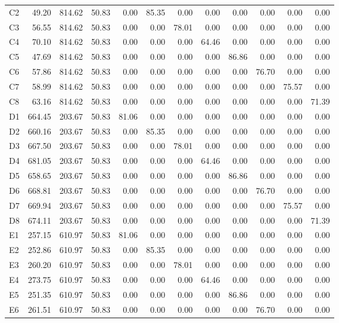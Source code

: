 \documentclass[sn-nature, twocolumn]{sn-jnl}%
\theoremstyle{thmstyleone}%
\theoremstyle{thmstyletwo}%
\theoremstyle{thmstylethree}%
\begin{document}
\begin{table}[!htb]
\begin{tabular}{lrrrrrrrrrrr}
C2 & 49.20 & 814.62 & 50.83 & 0.00 & 85.35 & 0.00 & 0.00 & 0.00 & 0.00 & 0.00 & 0.00 \\
C3 & 56.55 & 814.62 & 50.83 & 0.00 & 0.00 & 78.01 & 0.00 & 0.00 & 0.00 & 0.00 & 0.00 \\
C4 & 70.10 & 814.62 & 50.83 & 0.00 & 0.00 & 0.00 & 64.46 & 0.00 & 0.00 & 0.00 & 0.00 \\
C5 & 47.69 & 814.62 & 50.83 & 0.00 & 0.00 & 0.00 & 0.00 & 86.86 & 0.00 & 0.00 & 0.00 \\
C6 & 57.86 & 814.62 & 50.83 & 0.00 & 0.00 & 0.00 & 0.00 & 0.00 & 76.70 & 0.00 & 0.00 \\
C7 & 58.99 & 814.62 & 50.83 & 0.00 & 0.00 & 0.00 & 0.00 & 0.00 & 0.00 & 75.57 & 0.00 \\
C8 & 63.16 & 814.62 & 50.83 & 0.00 & 0.00 & 0.00 & 0.00 & 0.00 & 0.00 & 0.00 & 71.39 \\
D1 & 664.45 & 203.67 & 50.83 & 81.06 & 0.00 & 0.00 & 0.00 & 0.00 & 0.00 & 0.00 & 0.00 \\
D2 & 660.16 & 203.67 & 50.83 & 0.00 & 85.35 & 0.00 & 0.00 & 0.00 & 0.00 & 0.00 & 0.00 \\
D3 & 667.50 & 203.67 & 50.83 & 0.00 & 0.00 & 78.01 & 0.00 & 0.00 & 0.00 & 0.00 & 0.00 \\
D4 & 681.05 & 203.67 & 50.83 & 0.00 & 0.00 & 0.00 & 64.46 & 0.00 & 0.00 & 0.00 & 0.00 \\
D5 & 658.65 & 203.67 & 50.83 & 0.00 & 0.00 & 0.00 & 0.00 & 86.86 & 0.00 & 0.00 & 0.00 \\
D6 & 668.81 & 203.67 & 50.83 & 0.00 & 0.00 & 0.00 & 0.00 & 0.00 & 76.70 & 0.00 & 0.00 \\
D7 & 669.94 & 203.67 & 50.83 & 0.00 & 0.00 & 0.00 & 0.00 & 0.00 & 0.00 & 75.57 & 0.00 \\
D8 & 674.11 & 203.67 & 50.83 & 0.00 & 0.00 & 0.00 & 0.00 & 0.00 & 0.00 & 0.00 & 71.39 \\
E1 & 257.15 & 610.97 & 50.83 & 81.06 & 0.00 & 0.00 & 0.00 & 0.00 & 0.00 & 0.00 & 0.00 \\
E2 & 252.86 & 610.97 & 50.83 & 0.00 & 85.35 & 0.00 & 0.00 & 0.00 & 0.00 & 0.00 & 0.00 \\
E3 & 260.20 & 610.97 & 50.83 & 0.00 & 0.00 & 78.01 & 0.00 & 0.00 & 0.00 & 0.00 & 0.00 \\
E4 & 273.75 & 610.97 & 50.83 & 0.00 & 0.00 & 0.00 & 64.46 & 0.00 & 0.00 & 0.00 & 0.00 \\
E5 & 251.35 & 610.97 & 50.83 & 0.00 & 0.00 & 0.00 & 0.00 & 86.86 & 0.00 & 0.00 & 0.00 \\
E6 & 261.51 & 610.97 & 50.83 & 0.00 & 0.00 & 0.00 & 0.00 & 0.00 & 76.70 & 0.00 & 0.00 \\

\end{tabular}
\end{table}
\end{document}
